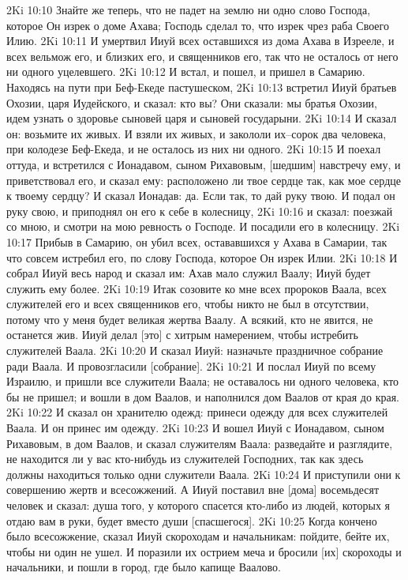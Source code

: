 2Ki 10:10  Знайте же теперь, что не падет на землю ни одно слово Господа, которое Он изрек о доме Ахава; Господь сделал то, что изрек чрез раба Своего Илию.
2Ki 10:11  И умертвил Ииуй всех оставшихся из дома Ахава в Изрееле, и всех вельмож его, и близких его, и священников его, так что не осталось от него ни одного уцелевшего.
2Ki 10:12  И встал, и пошел, и пришел в Самарию. Находясь на пути при Беф-Екеде пастушеском,
2Ki 10:13  встретил Ииуй братьев Охозии, царя Иудейского, и сказал: кто вы? Они сказали: мы братья Охозии, идем узнать о здоровье сыновей царя и сыновей государыни.
2Ki 10:14  И сказал он: возьмите их живых. И взяли их живых, и закололи их--сорок два человека, при колодезе Беф-Екеда, и не осталось из них ни одного.
2Ki 10:15  И поехал оттуда, и встретился с Ионадавом, сыном Рихавовым, [шедшим] навстречу ему, и приветствовал его, и сказал ему: расположено ли твое сердце так, как мое сердце к твоему сердцу? И сказал Ионадав: да. Если так, то дай руку твою. И подал он руку свою, и приподнял он его к себе в колесницу,
2Ki 10:16  и сказал: поезжай со мною, и смотри на мою ревность о Господе. И посадили его в колесницу.
2Ki 10:17  Прибыв в Самарию, он убил всех, остававшихся у Ахава в Самарии, так что совсем истребил его, по слову Господа, которое Он изрек Илии.
2Ki 10:18  И собрал Ииуй весь народ и сказал им: Ахав мало служил Ваалу; Ииуй будет служить ему более.
2Ki 10:19  Итак созовите ко мне всех пророков Ваала, всех служителей его и всех священников его, чтобы никто не был в отсутствии, потому что у меня будет великая жертва Ваалу. А всякий, кто не явится, не останется жив. Ииуй делал [это] с хитрым намерением, чтобы истребить служителей Ваала.
2Ki 10:20  И сказал Ииуй: назначьте праздничное собрание ради Ваала. И провозгласили [собрание].
2Ki 10:21  И послал Ииуй по всему Израилю, и пришли все служители Ваала; не оставалось ни одного человека, кто бы не пришел; и вошли в дом Ваалов, и наполнился дом Ваалов от края до края.
2Ki 10:22  И сказал он хранителю одежд: принеси одежду для всех служителей Ваала. И он принес им одежду.
2Ki 10:23  И вошел Ииуй с Ионадавом, сыном Рихавовым, в дом Ваалов, и сказал служителям Ваала: разведайте и разглядите, не находится ли у вас кто-нибудь из служителей Господних, так как здесь должны находиться только одни служители Ваала.
2Ki 10:24  И приступили они к совершению жертв и всесожжений. А Ииуй поставил вне [дома] восемьдесят человек и сказал: душа того, у которого спасется кто-либо из людей, которых я отдаю вам в руки, будет вместо души [спасшегося].
2Ki 10:25  Когда кончено было всесожжение, сказал Ииуй скороходам и начальникам: пойдите, бейте их, чтобы ни один не ушел. И поразили их острием меча и бросили [их] скороходы и начальники, и пошли в город, где было капище Ваалово.
